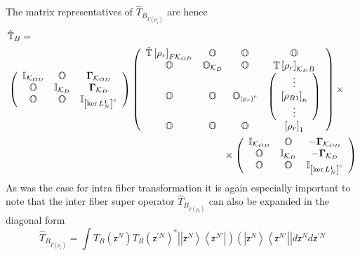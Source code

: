 \documentclass[aps,preprint]{revtex4}%
\begin{document}
The matrix representatives of $\hat{T}_{B_{\tilde{\Gamma}\left(
\mathfrak{\rho}_{r}\right)  }}$ are hence
\begin{align}
&  \mathbb{\hat{T}}_{B}=\nonumber\\
&  \left(
\begin{array}
[c]{ccc}%
\mathbb{I}_{\mathcal{K}_{OD}} & \mathbb{O} & \mathbf{\Gamma}_{\mathcal{K}%
_{OD}}\\
\mathbb{O} & \mathbb{I}_{\mathcal{K}_{D}} & \mathbf{\Gamma}_{\mathcal{K}_{D}%
}\\
\mathbb{O} & \mathbb{O} & \mathbb{I}_{\left[  \ker L_{N}^{1}\right]  ^{c}}%
\end{array}
\right)  \left(
\begin{array}
[c]{cccc}%
\mathbb{\hat{T}}\left[  \mathfrak{\rho}_{r}\right]  _{F\mathcal{K}_{OD}} &
\mathbb{O} & \mathbb{O} & \mathbb{O}\\
\mathbb{O} & \mathbb{O}_{\mathcal{K}_{D}} & \mathbb{O} & \mathbb{T}\left[
\mathfrak{\rho}_{r}\right]  _{\mathcal{K}_{D}B}\\
\mathbb{O} & \mathbb{O} & \mathbb{O}_{\left\vert \mathfrak{\rho}_{r}\right)
^{c}} & \left(
\begin{array}
[c]{c}%
\vdots\\
\left[  \mathfrak{\rho}_{B1}\right]  _{\kappa}\\
\vdots
\end{array}
\right) \\
\mathbb{O} & \mathbb{O} & \mathbb{O} & \left[  \mathfrak{\rho}_{r}\right]
_{1}%
\end{array}
\right)  \times\nonumber\\
&  \qquad\qquad\qquad\qquad\qquad\qquad\qquad\qquad\qquad\qquad\qquad
\times\left(
\begin{array}
[c]{ccc}%
\mathbb{I}_{\mathcal{K}_{OD}} & \mathbb{O} & -\mathbf{\Gamma}_{\mathcal{K}%
_{OD}}\\
\mathbb{O} & \mathbb{I}_{\mathcal{K}_{D}} & -\mathbf{\Gamma}_{\mathcal{K}_{D}%
}\\
\mathbb{O} & \mathbb{O} & \mathbb{I}_{\left[  \ker L_{N}^{1}\right]  ^{c}}%
\end{array}
\right)
\end{align}
As was the case for intra fiber transformation it is again especially
important to note that the inter fiber super operator $\hat{T}_{B_{\tilde
{\Gamma}\left(  \mathfrak{\rho}_{r}\right)  }}$ can also be expanded in the
diagonal form
\begin{equation}
\hat{T}_{B_{\tilde{\Gamma}\left(  \mathfrak{\rho}_{r}\right)  }}=\int
T_{B}\left(  \mathsf{z}^{N}\right)  T_{B}\left(  \mathsf{z}^{\prime N}\right)
^{\ast}\left\vert \left\vert \mathsf{z}^{N}\right\rangle \left\langle
\mathsf{z}^{N\prime}\right\vert \right)  \left(  \left\vert \mathsf{z}%
^{N}\right\rangle \left\langle \mathsf{z}^{N\prime}\right\vert \right\vert
d\mathsf{z}^{N}d\mathsf{z}^{\prime N}%
\end{equation}
\end{document}
